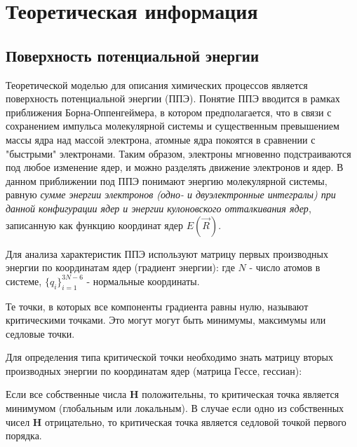 \section{Теоретическая информация}
\subsection{Поверхность потенциальной энергии}
Теоретической моделью для описания химических процессов является поверхность потенциальной энергии (ППЭ). Понятие ППЭ вводится в рамках приближения Борна-Оппенгеймера, в котором предполагается, что в связи с сохранением импульса молекулярной системы и существенным превышением массы ядра над массой электрона, атомные ядра покоятся в сравнении с "быстрыми" электронами. Таким образом, электроны мгновенно подстраиваются под любое изменение ядер, и можно разделять движение электронов и ядер. В данном приближении под ППЭ понимают энергию молекулярной системы, равную \textit{сумме энергии электронов (одно- и двуэлектронные интегралы) при данной конфигурации ядер и энергии кулоновского отталкивания ядер}, записанную как функцию координат ядер $E(\vec{R})$. 

Для анализа характеристик ППЭ используют матрицу первых производных энергии по координатам ядер (градиент энергии):
где $N$ - число атомов в системе, $\{q_i\}_{i=1}^{3N-6}$ - нормальные координаты.

Те точки, в которых все компоненты градиента равны нулю, называют критическими точками. Это могут могут быть минимумы, максимумы или седловые точки. 

Для определения типа критической точки необходимо знать матрицу вторых производных энергии по координатам ядер (матрица Гессе, гессиан):

Если все собственные числа \textbf{H} положительны, то критическая точка является минимумом (глобальным или локальным). В случае если одно из собственных чисел \textbf{H} отрицательно, то критическая точка является седловой точкой первого порядка.

